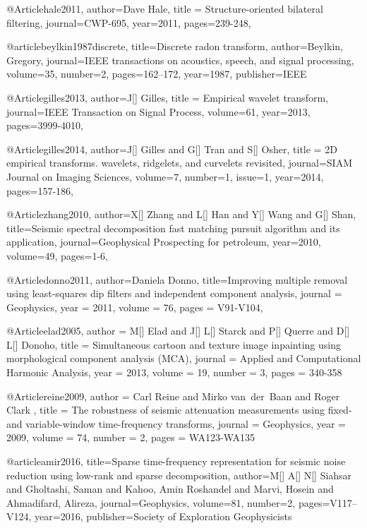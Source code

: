 @Article{hale2011,
  author={Dave Hale},
  title = {Structure-oriented bilateral filtering},
  journal={CWP-695},
  year=2011,
  pages={239-248},
}

@article{beylkin1987discrete,
  title={Discrete radon transform},
  author={Beylkin, Gregory},
  journal={IEEE transactions on acoustics, speech, and signal processing},
  volume={35},
  number={2},
  pages={162--172},
  year={1987},
  publisher={IEEE}
}


@Article{gilles2013,
  author={J[] Gilles},
  title = {Empirical wavelet transform},
  journal={IEEE Transaction on Signal Process},
  volume={61},
  year=2013,
  pages={3999-4010},
}

@Article{gilles2014,
  author={J[] Gilles and G[] Tran and S[] Osher},
  title = {2D empirical transforms. wavelets, ridgelets, and curvelets revisited},
  journal={SIAM Journal on Imaging Sciences},
  volume={7},
  number=1,
  issue=1,
  year=2014,
  pages={157-186},
}




@Article{zhang2010,
  author={X[] Zhang and L[] Han and Y[] Wang and G[] Shan},
  title={Seismic spectral decomposition fast matching pursuit algorithm and its application},
  journal={Geophysical Prospecting for petroleum},
  year=2010,
  volume=49,
  pages={1-6},
}

@Article{donno2011,
  author={Daniela Donno},
  title={Improving multiple removal using least-squares dip filters
and independent component analysis},
  journal = 	 {Geophysics},
  year = 	 2011,
  volume =	 76,
  pages =	 {V91-V104},
}

@Article{elad2005,
  author = 	 {M[] Elad and J[] L[] Starck and P[] Querre and D[] L[] Donoho},
  title = 	 {Simultaneous cartoon and texture image inpainting using morphological component analysis (MCA)},
  journal = 	 {Applied and Computational Harmonic Analysis},
  year = 	 2013,
  volume = 	 19,
  number = 	 3,
  pages = 	 {340-358}}

@Article{reine2009,
  author = 	 {Carl Reine and Mirko van~der~Baan and Roger Clark },
  title = 	 {The robustness of seismic attenuation measurements using fixed- and variable-window time-frequency transforms},
  journal = 	 {Geophysics},
  year = 	 2009,
  volume = 	 74,
  number = 	 2,
  pages = 	 {WA123-WA135}}


@article{amir2016,
  title={Sparse time-frequency representation for seismic noise reduction using low-rank and sparse decomposition},
  author={M[] A[] N[] Siahsar and Gholtashi, Saman and Kahoo, Amin Roshandel and Marvi, Hosein and Ahmadifard, Alireza},
  journal={Geophysics},
  volume={81},
  number={2},
  pages={V117--V124},
  year={2016},
  publisher={Society of Exploration Geophysicists}
}

